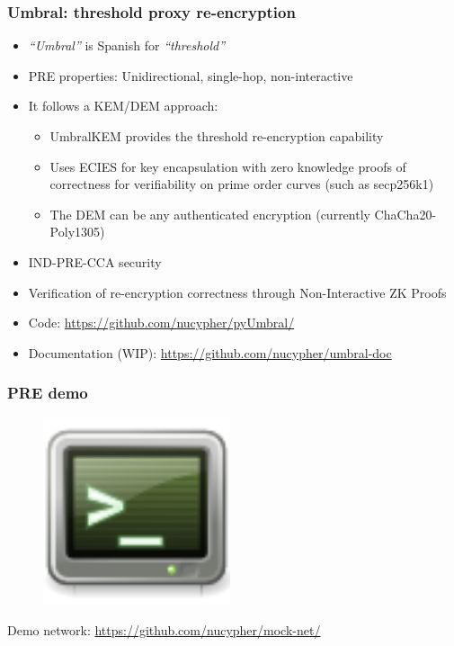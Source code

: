\documentclass[xetex,mathsans,sans,aspectratio=169]{beamer}
\begin{document}
    \begin{frame}
        \frametitle{Umbral: threshold proxy re-encryption}
        \begin{itemize}
        	\item \emph{``Umbral''} is Spanish for \emph{``threshold''}
            \item PRE properties: Unidirectional, single-hop, non-interactive
            \item It follows a KEM/DEM approach:
            	\begin{itemize}
					\item UmbralKEM provides the threshold re-encryption capability
                    \item Uses ECIES for key encapsulation with zero knowledge proofs of correctness for verifiability on prime order curves (such as secp256k1)
            		\item The DEM can be any authenticated encryption (currently ChaCha20-Poly1305)
        		\end{itemize}
			\item IND-PRE-CCA security
			\item Verification of re-encryption correctness through Non-Interactive ZK Proofs
			\item Code: \url{https://github.com/nucypher/pyUmbral/}
			\item Documentation (WIP): \url{https://github.com/nucypher/umbral-doc}
        \end{itemize}
    \end{frame}

    \begin{frame}
        \frametitle{PRE demo}
        \begin{figure}
            \centering
            \includegraphics[height=5.5cm]{pdf/terminal.pdf}
        \end{figure}
        Demo network: \url{https://github.com/nucypher/mock-net/}
    \end{frame}
\end{document}
